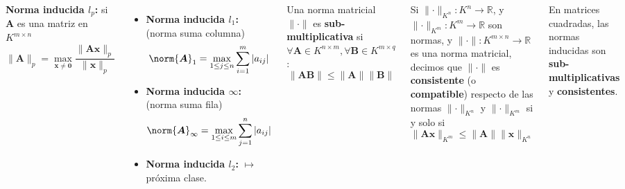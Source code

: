 \documentclass[9pt, aspectratio=169]{beamer}
\begin{document}
\begin{frame}
\begin{columns}[t]
\cx
\textbf{Norma inducida $l_p$:} si $\bm{A}$ es una matriz en $K^{m \times n}$
\[ \lVert \bm{A} \rVert_p = \max_{\bm{x} \neq \bm{0}} \frac{ \lVert \bm{A} \bm{x}\rVert_p }{\lVert \bm{x} \rVert_p} \]
\begin{itemize}
  \item \textbf{Norma inducida $l_1$:} (norma suma columna)
      \[ \norm{\bm{A}}_1 = \max_{1 \leq j \leq n} \sum_{i=1}^m |a_{ij}| \]
  \item \textbf{Norma inducida ${\infty}$:} (norma suma fila)
      \[ \norm{\bm{A}}_{\infty} = \max_{1 \leq i \leq m} \sum_{j=1}^n |a_{ij}| \]
  \item \textbf{Norma inducida $l_2$:} $\mapsto$ \alert{próxima clase}.
\end{itemize}
\pause

\cx
\begin{definition}
  Una norma matricial $\lVert \cdot \rVert$ es \textbf{sub-multiplicativa} si $\forall \bm{A} \in K^{n \times m}, \forall \bm{B} \in K^{m \times q}$:
  \[ \lVert \bm{A} \bm{B} \rVert \leq \lVert \bm{A} \rVert \lVert \bm{B} \rVert \]
\end{definition}

\begin{definition}[Consistencia]
  Si $\lVert \cdot \rVert_{K^n} : K^n \rightarrow \mathbb{R}$, y $\lVert \cdot \rVert_{K^m} : K^m \rightarrow \mathbb{R}$ son normas, y $\lVert \cdot \rVert : K^{m \times n} \rightarrow \mathbb{R}$ es una norma matricial, decimos que $\lVert \cdot \rVert$ es \textbf{consistente} (o \textbf{compatible}) respecto de las normas $\lVert \cdot \rVert_{K^n}$ y $\lVert \cdot \rVert_{K^m}$ si y solo si
  \[ \lVert \bm{A} \bm{x} \rVert_{K^m} \leq \lVert \bm{A} \rVert \lVert \bm{x} \rVert_{K^n} \]
\end{definition}
En matrices cuadradas, las normas inducidas son \textbf{sub-multiplicativas} y \textbf{consistentes}.
\end{columns}
\end{frame}
\end{document}
